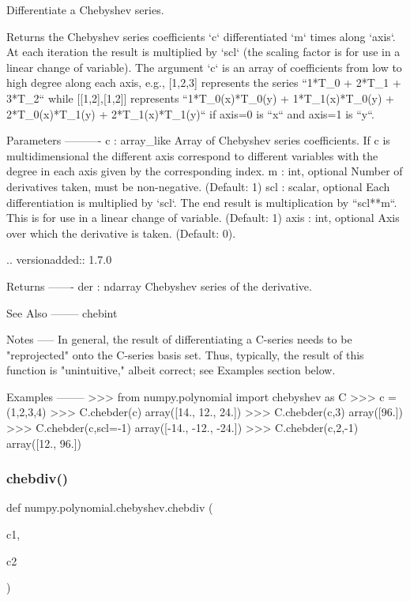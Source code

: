 \begin{DoxyVerb}Differentiate a Chebyshev series.

Returns the Chebyshev series coefficients `c` differentiated `m` times
along `axis`.  At each iteration the result is multiplied by `scl` (the
scaling factor is for use in a linear change of variable). The argument
`c` is an array of coefficients from low to high degree along each
axis, e.g., [1,2,3] represents the series ``1*T_0 + 2*T_1 + 3*T_2``
while [[1,2],[1,2]] represents ``1*T_0(x)*T_0(y) + 1*T_1(x)*T_0(y) +
2*T_0(x)*T_1(y) + 2*T_1(x)*T_1(y)`` if axis=0 is ``x`` and axis=1 is
``y``.

Parameters
----------
c : array_like
    Array of Chebyshev series coefficients. If c is multidimensional
    the different axis correspond to different variables with the
    degree in each axis given by the corresponding index.
m : int, optional
    Number of derivatives taken, must be non-negative. (Default: 1)
scl : scalar, optional
    Each differentiation is multiplied by `scl`.  The end result is
    multiplication by ``scl**m``.  This is for use in a linear change of
    variable. (Default: 1)
axis : int, optional
    Axis over which the derivative is taken. (Default: 0).

    .. versionadded:: 1.7.0

Returns
-------
der : ndarray
    Chebyshev series of the derivative.

See Also
--------
chebint

Notes
-----
In general, the result of differentiating a C-series needs to be
"reprojected" onto the C-series basis set. Thus, typically, the
result of this function is "unintuitive," albeit correct; see Examples
section below.

Examples
--------
>>> from numpy.polynomial import chebyshev as C
>>> c = (1,2,3,4)
>>> C.chebder(c)
array([14., 12., 24.])
>>> C.chebder(c,3)
array([96.])
>>> C.chebder(c,scl=-1)
array([-14., -12., -24.])
>>> C.chebder(c,2,-1)
array([12.,  96.])\end{DoxyVerb}
 \mbox{\label{namespacenumpy_1_1polynomial_1_1chebyshev_ade0590b0e276cb9e062a58085444acda}} 
\subsubsection{\texorpdfstring{chebdiv()}{chebdiv()}}
{\footnotesize\ttfamily def numpy.\+polynomial.\+chebyshev.\+chebdiv (\begin{DoxyParamCaption}\item[{}]{c1,  }\item[{}]{c2 }\end{DoxyParamCaption})}

